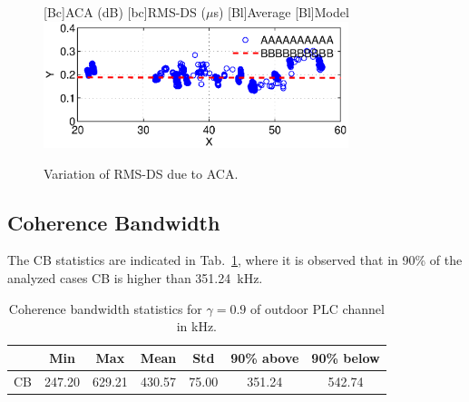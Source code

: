 \documentclass[journal]{IEEEtran}
\newcommand{\tamfig}{3.5in}    %
\begin{document}
\begin{figure}[!htp]
\begin{centering}
    [Bc]{ACA (dB)}    
    [bc]{RMS-DS ($\mu$s)}
    [Bl]{Average}
    [Bl]{Model}
    \includegraphics[width=\tamfig]{Figuras/ACGxRMSDS.eps}
    \caption{Variation of RMS-DS due to ACA.}
    \label{Fig:ACMxRMSDS}
\end{centering}
\end{figure}

\subsection{Coherence Bandwidth}\label{sec-bandadecoerencia}

The \ac{CB} statistics are indicated in Tab.~\ref{Tab:EstatisticasCB}, where it is observed that in 90\% of the analyzed cases  \ac{CB} is higher than 351.24~kHz.
\begin{table}[!htb]
\centering
\caption{Coherence bandwidth statistics for $\gamma = 0.9$ of outdoor PLC channel in kHz.}
\footnotesize 
\begin{tabular}{c|c|c|c|c|c|c}
\hline 
                  &  Min    & Max    & Mean    & Std     & 90\% above   & 90\% below \\
\hline 
CB                & 247.20  & 629.21 &  430.57 & 75.00   & 351.24       & 542.74 \\
\hline
\end{tabular} \label{Tab:EstatisticasCB}
\newline
\end{table} 
\end{document}
